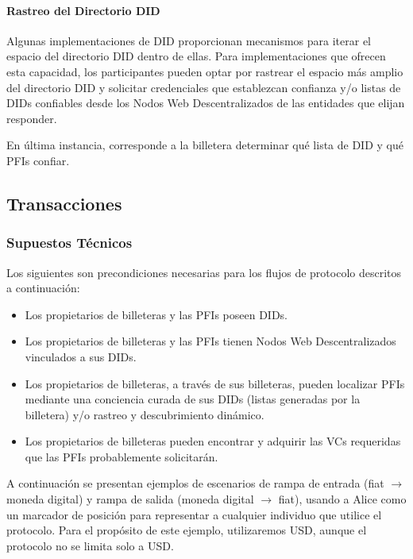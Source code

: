 \documentclass[11pt]{article}
\begin{document}
\paragraph{Rastreo del Directorio DID}

Algunas implementaciones de DID proporcionan mecanismos para iterar el espacio del directorio DID dentro de ellas. Para implementaciones que ofrecen esta capacidad, los participantes pueden optar por rastrear el espacio más amplio del directorio DID y solicitar credenciales que establezcan confianza y/o listas de DIDs confiables desde los Nodos Web Descentralizados de las entidades que elijan responder.

\vspace{1\baselineskip}
En última instancia, corresponde a la billetera determinar qué lista de DID y qué PFIs confiar.

\vspace{1\baselineskip}
\subsection{Transacciones}

\subsubsection{Supuestos Técnicos}

Los siguientes son precondiciones necesarias para los flujos de protocolo descritos a continuación:

\begin{itemize}
	\item Los propietarios de billeteras y las PFIs poseen DIDs.

	\item Los propietarios de billeteras y las PFIs tienen Nodos Web Descentralizados vinculados a sus DIDs.

	\item Los propietarios de billeteras, a través de sus billeteras, pueden localizar PFIs mediante una conciencia curada de sus DIDs (listas generadas por la billetera) y/o rastreo y descubrimiento dinámico.

	\item Los propietarios de billeteras pueden encontrar y adquirir las VCs requeridas que las PFIs probablemente solicitarán.

\vspace{1\baselineskip}
\end{itemize}
A continuación se presentan ejemplos de escenarios de rampa de entrada (fiat $\rightarrow$ moneda digital) y rampa de salida (moneda digital $\rightarrow$ fiat), usando a Alice como un marcador de posición para representar a cualquier individuo que utilice el protocolo. Para el propósito de este ejemplo, utilizaremos USD, aunque el protocolo no se limita solo a USD.
\end{document}

